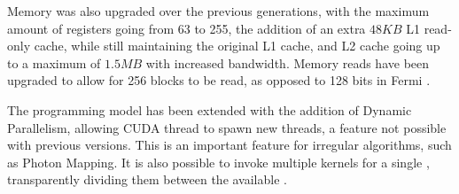 \documentclass[main.tex]{subfiles}
\begin{document}
Memory was also upgraded over the previous generations, with the maximum amount of registers going from 63 to 255, the addition of an extra $48KB$ L1 read-only cache, while still maintaining the original L1 cache, and L2 cache going up to a maximum of $1.5MB$ with increased bandwidth. Memory reads have been upgraded to allow for 256 blocks to be read, as opposed to 128 bits in Fermi \cite{NVIDIA:kepler}.

The programming model has been extended with the addition of Dynamic Parallelism, allowing \acs{CUDA} thread to spawn new threads, a feature not possible with previous versions. This is an important feature for irregular algorithms, such as Photon Mapping. It is also possible to invoke multiple kernels for a single \gpu, transparently dividing them between the available \smxs.
\end{document}
